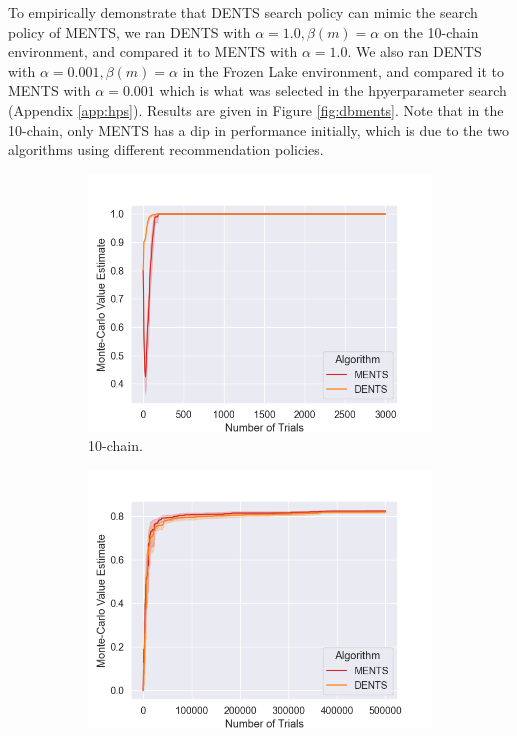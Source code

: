 
To empirically demonstrate that DENTS search policy can mimic the search policy of MENTS, we ran DENTS with $\alpha=1.0,\beta(m)=\alpha$ on the 10-chain environment, and compared it to MENTS with $\alpha=1.0$. We also ran DENTS with $\alpha=0.001, \beta(m)=\alpha$ in the Frozen Lake environment, and compared it to MENTS with $\alpha=0.001$ which is what was selected in the hpyerparameter search (Appendix \ref{app:hps}). Results are given in Figure \ref{fig:dbments}. Note that in the 10-chain, only MENTS has a dip in performance initially, which is due to the two algorithms using different recommendation policies.


\begin{figure}
    \centering
    \begin{subfigure}[b]{0.49\textwidth}
        \centering
        \includegraphics[width=\textwidth]{figures/temp/dbments/dbments_dchain.png}
        \caption{10-chain.}
    \end{subfigure}
    \begin{subfigure}[b]{0.49\textwidth}
        \centering
        \includegraphics[width=\textwidth]{figures/temp/dbments/dbments_fl.png}

\end{subfigure}
\end{figure}
